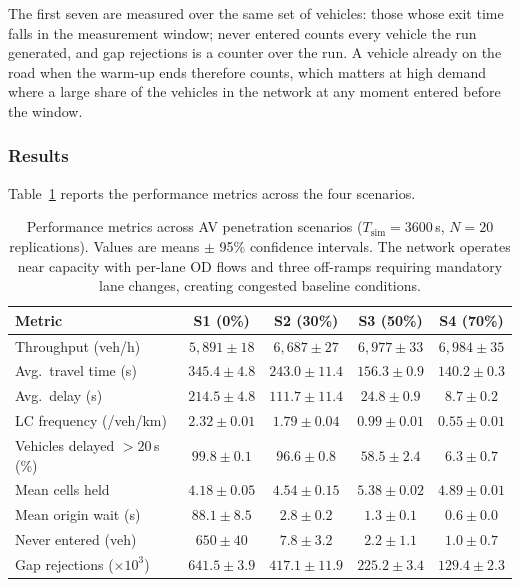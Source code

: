 \documentclass[review,number]{elsarticle}
\begin{document}
The first seven are measured over the same set of vehicles: those whose exit time falls in the measurement window; never entered counts every vehicle the run generated, and gap rejections is a counter over the run. A vehicle already on the road when the warm-up ends therefore counts, which matters at high demand where a large share of the vehicles in the network at any moment entered before the window.

\subsubsection{Results}

Table~\ref{tab:results_mixed} reports the performance metrics across the four scenarios.

\begin{table}[ht]
\centering
\caption{Performance metrics across AV penetration scenarios ($T_{\text{sim}} = 3600$\,s, $N = 20$ replications). Values are means $\pm$ 95\% confidence intervals. The network operates near capacity with per-lane OD flows and three off-ramps requiring mandatory lane changes, creating congested baseline conditions.}
\label{tab:results_mixed}
\begin{tabular}{@{}lcccc@{}}
\toprule
Metric & S1 (0\%) & S2 (30\%) & S3 (50\%) & S4 (70\%) \\
\midrule
Throughput (veh/h) & $5{,}891 \pm 18$ & $6{,}687 \pm 27$ & $6{,}977 \pm 33$ & $6{,}984 \pm 35$ \\
Avg.\ travel time (s) & $345.4 \pm 4.8$ & $243.0 \pm 11.4$ & $156.3 \pm 0.9$ & $140.2 \pm 0.3$ \\
Avg.\ delay (s) & $214.5 \pm 4.8$ & $111.7 \pm 11.4$ & $24.8 \pm 0.9$ & $8.7 \pm 0.2$ \\
LC frequency (/veh/km) & $2.32 \pm 0.01$ & $1.79 \pm 0.04$ & $0.99 \pm 0.01$ & $0.55 \pm 0.01$ \\
Vehicles delayed $>20$\,s (\%) & $99.8 \pm 0.1$ & $96.6 \pm 0.8$ & $58.5 \pm 2.4$ & $6.3 \pm 0.7$ \\
Mean cells held & $4.18 \pm 0.05$ & $4.54 \pm 0.15$ & $5.38 \pm 0.02$ & $4.89 \pm 0.01$ \\
Mean origin wait (s) & $88.1 \pm 8.5$ & $2.8 \pm 0.2$ & $1.3 \pm 0.1$ & $0.6 \pm 0.0$ \\
Never entered (veh) & $650 \pm 40$ & $7.8 \pm 3.2$ & $2.2 \pm 1.1$ & $1.0 \pm 0.7$ \\
Gap rejections ($\times 10^3$) & $641.5 \pm 3.9$ & $417.1 \pm 11.9$ & $225.2 \pm 3.4$ & $129.4 \pm 2.3$ \\
\bottomrule
\end{tabular}
\end{table}
\end{document}
